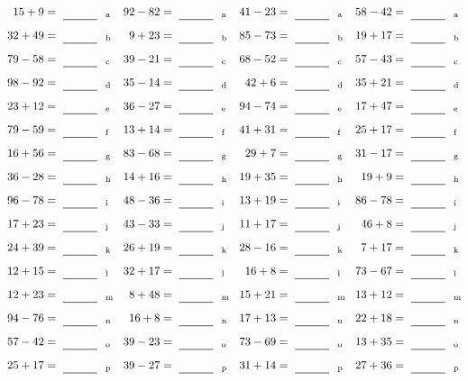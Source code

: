 \documentclass
[
  draft    = true,
  fontsize = 11pt,
  parskip  = half-
]
{scrartcl}
\begin{document}
\clearpage
\begin{align*}
    \pline{15+9}&=\rline{a}
  & \pline{92-82}&=\rline{a}
  & \pline{41-23}&=\rline{a}
  & \pline{58-42}&=\rline{a} \\[1ex]
    \pline{32+49}&=\rline{b}
  & \pline{9+23}&=\rline{b}
  & \pline{85-73}&=\rline{b}
  & \pline{19+17}&=\rline{b} \\[1ex]
    \pline{79-58}&=\rline{c}
  & \pline{39-21}&=\rline{c}
  & \pline{68-52}&=\rline{c}
  & \pline{57-43}&=\rline{c} \\[1ex]
    \pline{98-92}&=\rline{d}
  & \pline{35-14}&=\rline{d}
  & \pline{42+6}&=\rline{d}
  & \pline{35+21}&=\rline{d} \\[1ex]
    \pline{23+12}&=\rline{e}
  & \pline{36-27}&=\rline{e}
  & \pline{94-74}&=\rline{e}
  & \pline{17+47}&=\rline{e} \\[1ex]
    \pline{79-59}&=\rline{f}
  & \pline{13+14}&=\rline{f}
  & \pline{41+31}&=\rline{f}
  & \pline{25+17}&=\rline{f} \\[1ex]
    \pline{16+56}&=\rline{g}
  & \pline{83-68}&=\rline{g}
  & \pline{29+7}&=\rline{g}
  & \pline{31-17}&=\rline{g} \\[1ex]
    \pline{36-28}&=\rline{h}
  & \pline{14+16}&=\rline{h}
  & \pline{19+35}&=\rline{h}
  & \pline{19+9}&=\rline{h} \\[1ex]
    \pline{96-78}&=\rline{i}
  & \pline{48-36}&=\rline{i}
  & \pline{13+19}&=\rline{i}
  & \pline{86-78}&=\rline{i} \\[1ex]
    \pline{17+23}&=\rline{j}
  & \pline{43-33}&=\rline{j}
  & \pline{11+17}&=\rline{j}
  & \pline{46+8}&=\rline{j} \\[1ex]
    \pline{24+39}&=\rline{k}
  & \pline{26+19}&=\rline{k}
  & \pline{28-16}&=\rline{k}
  & \pline{7+17}&=\rline{k} \\[1ex]
    \pline{12+15}&=\rline{l}
  & \pline{32+17}&=\rline{l}
  & \pline{16+8}&=\rline{l}
  & \pline{73-67}&=\rline{l} \\[1ex]
    \pline{12+23}&=\rline{m}
  & \pline{8+48}&=\rline{m}
  & \pline{15+21}&=\rline{m}
  & \pline{13+12}&=\rline{m} \\[1ex]
    \pline{94-76}&=\rline{n}
  & \pline{16+8}&=\rline{n}
  & \pline{17+13}&=\rline{n}
  & \pline{22+18}&=\rline{n} \\[1ex]
    \pline{57-42}&=\rline{o}
  & \pline{39-23}&=\rline{o}
  & \pline{73-69}&=\rline{o}
  & \pline{13+35}&=\rline{o} \\[1ex]
    \pline{25+17}&=\rline{p}
  & \pline{39-27}&=\rline{p}
  & \pline{31+14}&=\rline{p}
  & \pline{27+36}&=\rline{p}
\end{align*}
\end{document}
